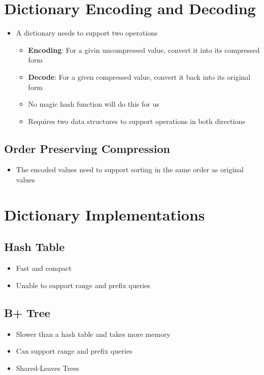 \documentclass[11pt]{article}
\begin{document}
\section{Dictionary Encoding and Decoding}
\begin{itemize}
    \item A dictionary needs to support two operations
    \begin{itemize}
        \item \textbf{Encoding}: For a givin uncompressed value, convert it into its compressed form
        \item \textbf{Decode}: For a given compressed value, convert it back into its original form
        \item No magic hash function will do this for us
        \item Requires two data structures to support operations in both directions
    \end{itemize}
\end{itemize}

    \subsection*{Order Preserving Compression}
    \begin{itemize}
        \item The encoded values need to support sorting in the same order as original values
    \end{itemize}

\section{Dictionary Implementations}
    \subsection*{Hash Table}
    \begin{itemize}
        \item Fast and compact
        \item Unable to support range and prefix queries
    \end{itemize}
    \subsection*{B+ Tree}
    \begin{itemize}
        \item Slower than a hash table and takes more memory
        \item Can support range and prefix queries
        \item Shared-Leaves Trees ~\cite{p283-binnig}
    \end{itemize}


\newpage


\end{document}
